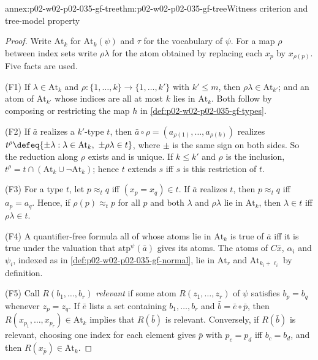 \begin{annexitem}{annex:p02-w02-p02-035-gf-tree}{thm:p02-w02-p02-035-gf-tree}{Witness criterion and tree-model property}
\begin{proof}
Write \(\mathrm{At}_k\) for \(\mathrm{At}_k(\psi)\) and \(\tau\) for the
vocabulary of \(\psi\).  For a map \(\rho\) between index sets write
\(\rho\lambda\) for the atom obtained by replacing each \(x_p\) by
\(x_{\rho(p)}\).  Five facts are used.

(F1) If \(\lambda\in\mathrm{At}_k\) and \(\rho:\{1,\ldots,k\}\to\{1,\ldots,k'\}\)
with \(k'\leq m\), then \(\rho\lambda\in\mathrm{At}_{k'}\); and an atom of
\(\mathrm{At}_{k'}\) whose indices are all at most \(k\) lies in
\(\mathrm{At}_k\).  Both follow by composing or restricting the map \(h\) in
\cref{def:p02-w02-p02-035-gf-types}.

(F2) If \(\bar a\) realizes a \(k'\)-type \(t\), then
\(\bar a\circ\rho=(a_{\rho(1)},\ldots,a_{\rho(k)})\) realizes
\(t^\rho\defeq\{\pm\lambda:\lambda\in\mathrm{At}_k,\ \pm\rho\lambda\in t\}\),
where \(\pm\) is the same sign on both sides.  So the reduction along
\(\rho\) exists and is unique.  If \(k\leq k'\) and \(\rho\) is the inclusion,
\(t^\rho=t\cap(\mathrm{At}_k\cup\neg\mathrm{At}_k)\); hence \(t\) extends
\(s\) iff \(s\) is this restriction of \(t\).

(F3) For a type \(t\), let \(p\approx_t q\) iff \((x_p=x_q)\in t\).  If
\(\bar a\) realizes \(t\), then \(p\approx_t q\) iff \(a_p=a_q\).  Hence, if
\(\rho(p)\approx_t p\) for all \(p\) and both \(\lambda\) and \(\rho\lambda\)
lie in \(\mathrm{At}_k\), then \(\lambda\in t\) iff \(\rho\lambda\in t\).

(F4) A quantifier-free formula all of whose atoms lie in \(\mathrm{At}_k\) is
true of \(\bar a\) iff it is true under the valuation that
\(\mathrm{atp}^{\psi}(\bar a)\) gives its atoms.  The atoms of
\(C\bar x\), \(\alpha_i\) and \(\psi_i\), indexed as in
\cref{def:p02-w02-p02-035-gf-normal}, lie in \(\mathrm{At}_r\) and
\(\mathrm{At}_{k_i+\ell_i}\) by definition.

(F5) Call \(R(b_1,\ldots,b_r)\) \emph{relevant} if some atom
\(R(z_1,\ldots,z_r)\) of \(\psi\) satisfies \(b_p=b_q\) whenever
\(z_p=z_q\).  If \(\bar e\) lists a set containing \(b_1,\ldots,b_r\) and
\(\bar b=\bar e\circ\bar p\), then \(R(x_{p_1},\ldots,x_{p_r})\in\mathrm{At}_k\)
implies that \(R(\bar b)\) is relevant.  Conversely, if \(R(\bar b)\) is
relevant, choosing one index for each element gives \(\bar p\) with
\(p_c=p_d\) iff \(b_c=b_d\), and then \(R(x_{\bar p})\in\mathrm{At}_k\).


\end{proof}
\end{annexitem}
